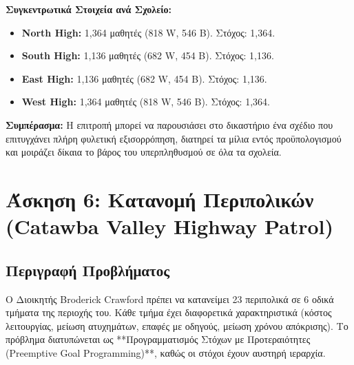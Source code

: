 \documentclass[12pt, a4paper]{article}
\begin{document}
\begin{table}[h]
\centering
{}
\caption{Λεπτομερής κατανομή μαθητών για την επίτευξη όλων των στόχων.}
\end{table}

\textbf{Συγκεντρωτικά Στοιχεία ανά Σχολείο:}
\begin{itemize}
    \item \textbf{North High:} 1,364 μαθητές (818 W, 546 B). Στόχος: 1,364.
    \item \textbf{South High:} 1,136 μαθητές (682 W, 454 B). Στόχος: 1,136.
    \item \textbf{East High:} 1,136 μαθητές (682 W, 454 B). Στόχος: 1,136.
    \item \textbf{West High:} 1,364 μαθητές (818 W, 546 B). Στόχος: 1,364.
\end{itemize}

\textbf{Συμπέρασμα:}
Η επιτροπή μπορεί να παρουσιάσει στο δικαστήριο ένα σχέδιο που επιτυγχάνει πλήρη φυλετική εξισορρόπηση, διατηρεί τα μίλια εντός προϋπολογισμού και μοιράζει δίκαια το βάρος του υπερπληθυσμού σε όλα τα σχολεία.




\section*{Άσκηση 6: Κατανομή Περιπολικών (Catawba Valley Highway Patrol)}

\subsection*{Περιγραφή Προβλήματος}
Ο Διοικητής Broderick Crawford πρέπει να κατανείμει 23 περιπολικά σε 6 οδικά τμήματα της περιοχής του. Κάθε τμήμα έχει διαφορετικά χαρακτηριστικά (κόστος λειτουργίας, μείωση ατυχημάτων, επαφές με οδηγούς, μείωση χρόνου απόκρισης). Το πρόβλημα διατυπώνεται ως **Προγραμματισμός Στόχων με Προτεραιότητες (Preemptive Goal Programming)**, καθώς οι στόχοι έχουν αυστηρή ιεραρχία.
\end{document}
